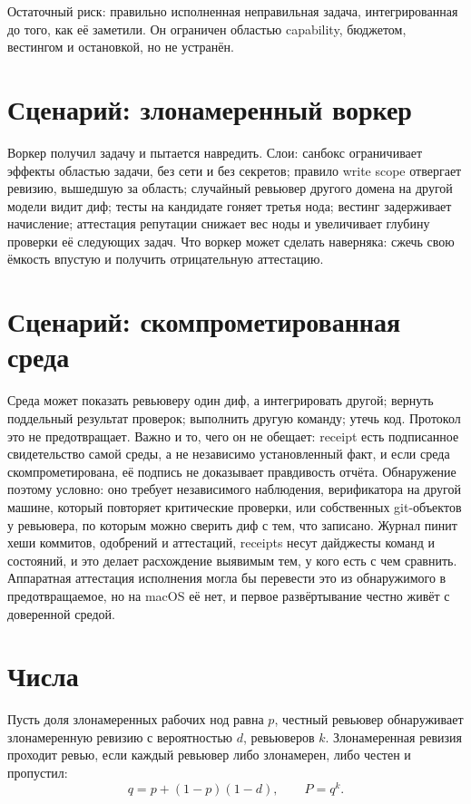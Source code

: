 Остаточный риск: правильно исполненная неправильная задача, интегрированная до того, как её заметили. Он ограничен областью capability, бюджетом, вестингом и остановкой, но не устранён.

\section{Сценарий: злонамеренный воркер}

Воркер получил задачу и пытается навредить. Слои: санбокс ограничивает эффекты областью задачи, без сети и без секретов; правило write scope отвергает ревизию, вышедшую за область; случайный ревьювер другого домена на другой модели видит диф; тесты на кандидате гоняет третья нода; вестинг задерживает начисление; аттестация репутации снижает вес ноды и увеличивает глубину проверки её следующих задач. Что воркер может сделать наверняка: сжечь свою ёмкость впустую и получить отрицательную аттестацию.

\section{Сценарий: скомпрометированная среда}

Среда может показать ревьюверу один диф, а интегрировать другой; вернуть поддельный результат проверок; выполнить другую команду; утечь код. Протокол это не предотвращает. Важно и то, чего он не обещает: receipt есть подписанное свидетельство самой среды, а не независимо установленный факт, и если среда скомпрометирована, её подпись не доказывает правдивость отчёта. Обнаружение поэтому условно: оно требует независимого наблюдения, верификатора на другой машине, который повторяет критические проверки, или собственных git-объектов у ревьювера, по которым можно сверить диф с тем, что записано. Журнал пинит хеши коммитов, одобрений и аттестаций, receipts несут дайджесты команд и состояний, и это делает расхождение выявимым тем, у кого есть с чем сравнить. Аппаратная аттестация исполнения могла бы перевести это из обнаружимого в предотвращаемое, но на macOS её нет, и первое развёртывание честно живёт с доверенной средой.

\section{Числа}

Пусть доля злонамеренных рабочих нод равна $p$, честный ревьювер обнаруживает злонамеренную ревизию с вероятностью $d$, ревьюверов $k$. Злонамеренная ревизия проходит ревью, если каждый ревьювер либо злонамерен, либо честен и пропустил:
\[
q = p + (1 - p)(1 - d), \qquad P = q^{k}.
\]

